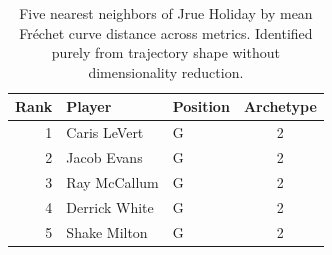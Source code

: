 \begin{table}[htbp]
  \centering\small
  \begin{tabular}{rllc}
    \toprule
    Rank & Player & Position & Archetype \\
    \midrule
    1 & Caris LeVert & G & 2 \\
    2 & Jacob Evans & G & 2 \\
    3 & Ray McCallum & G & 2 \\
    4 & Derrick White & G & 2 \\
    5 & Shake Milton & G & 2 \\
    \bottomrule
  \end{tabular}
  \caption{Five nearest neighbors of Jrue Holiday by mean Fr\'{e}chet curve distance across metrics. Identified purely from trajectory shape without dimensionality reduction.}
  \label{tab:Jrue_Holiday_frechet_curve_neighbors}
\end{table}

